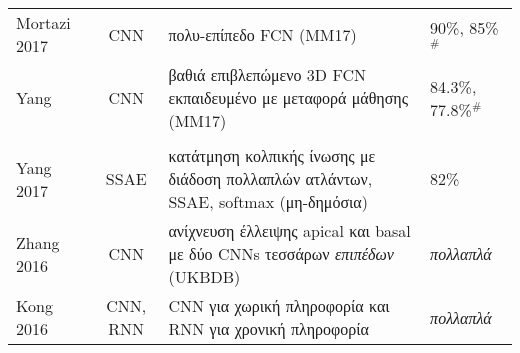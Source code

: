 \begin{sidewaystable}
\begin{tabular}{l c l l}
		Mortazi 2017~\cite{mortazi2017multi}       & CNN             & πολυ-επίπεδο FCN (MM17)                                                                         & 90\%, 85\%$^\#$                                                                                                                                                                                                                                 \\
		Yang~\cite{yang2017hybrid}                 & CNN             & βαθιά επιβλεπώμενο 3D FCN εκπαιδευμένο με μεταφορά μάθησης (MM17)                               & 84.3\%, 77.8\%$^\#$                                                                                                                                                                                                                             \\
		\midrule
		\multicolumn{4}{l}{\thead{Άλλες εφαρμογές}}                                                                                                                                                                                                                                                                                                                                                                     \\
		\midrule
		Yang 2017~\cite{yang2017segmenting}        & SSAE            & κατάτμηση κολπικής ίνωσης με διάδοση πολλαπλών ατλάντων, SSAE, softmax (μη-δημόσια)      & 82\%                                                                                                                                                                                                                                            \\
		Zhang 2016~\cite{zhang2016automated}       & CNN             & ανίχνευση έλλειψης apical και basal με δύο CNNs τεσσάρων \textit{επιπέδων} (UKBDB)              & \textit{πολλαπλά}                                                                                                                                                                                                                               \\
		Kong 2016~\cite{kong2016recognizing}       & CNN, RNN        & CNN για χωρική πληροφορία και RNN για χρονική πληροφορία                                        & \textit{πολλαπλά}                                                                                                                                                                                                                               \\

\end{tabular}
\end{sidewaystable}
